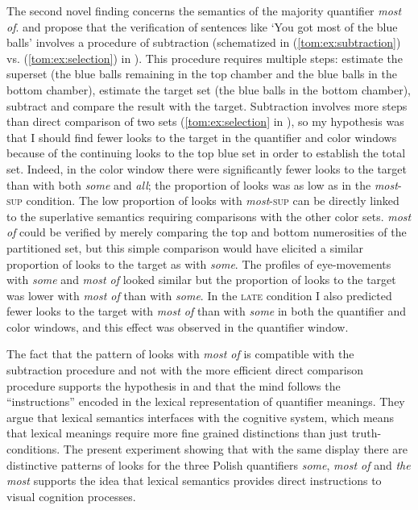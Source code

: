 \documentclass[output=paper]{langscibook}
\begin{document}
The second novel finding concerns the semantics of the majority quantifier \textit{most of}. \citet{pietroski2009meaning} and
\citet{lidz2011interface} propose that the verification of sentences like `You got most of the blue
balls' involves a procedure of subtraction (schematized in (\ref{tom:ex:subtraction}) vs. (\ref{tom:ex:selection}) in ). This procedure requires
multiple steps: estimate the superset (the blue balls remaining in the top chamber and the blue balls in the bottom
chamber), estimate the target set (the blue balls in the bottom chamber), subtract and compare the result with the
target. Subtraction involves more steps than direct comparison of two sets (\ref{tom:ex:selection} in ), so my hypothesis was
that I should find fewer looks to the target in the quantifier and color windows because of the continuing looks to
the top blue set in order to establish the total set. Indeed, in the color window there were significantly fewer looks
to the target than with both \textit{some} and \textit{all}; the proportion of looks was as low as in the
\textit{most}\textsc{-sup} condition. The low proportion of looks with \textit{most}\textsc{-sup} can be
directly linked to the superlative semantics requiring comparisons with the other color sets. \textit{most of} could be
verified by merely comparing the top and bottom numerosities of the partitioned set, but this simple comparison would
have elicited a similar proportion of looks to the target as with \textit{some}. The profiles of eye-movements with
\textit{some} and \textit{most of} looked similar but the proportion of looks to the target was lower with \textit{most
of} than with \textit{some}. In the \textsc{late} condition I also predicted fewer looks to the target with \textit{most of}
than with \textit{some} in both the quantifier and color windows, and this effect was observed in the quantifier
window.

The fact that the pattern of looks with \textit{most of} is compatible with the subtraction procedure and not with the
more efficient direct comparison procedure supports the hypothesis in \citet{pietroski2009meaning} and
\citet{lidz2011interface}
that the mind follows the “instructions” encoded in the lexical representation of quantifier meanings. They argue that
lexical semantics interfaces with the cognitive system, which means that lexical meanings require more fine grained
distinctions than just truth-conditions. The present experiment showing that with the same display there are
distinctive patterns of looks for the three Polish quantifiers \textit{some}, \textit{most of} and \textit{the most}
supports the idea that lexical semantics provides direct instructions to visual cognition processes.
\end{document}
